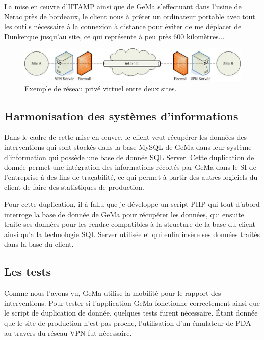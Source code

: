 La mise en \oe{}uvre d'IITAMP ainsi que de GeMa s'effectuant dans
l'usine de Nerac près de bordeaux, le client nous à prêter un ordinateur
portable avec tout les outils nécessaire à la connexion à distance pour
éviter de me déplacer de Dunkerque jusqu'au site, ce qui représente à
peu près 600 kilomètres...

\begin{figure}
  \begin{center}
    \includegraphics[scale=0.5]{images/vpn.png}
    \caption{Exemple de réseau privé virtuel entre deux sites.}
    \label{vpn}
  \end{center}
\end{figure}

\subsection{Harmonisation des systèmes d'informations} %
\label{sub:Harmonisation des systèmes d'informations}

Dans le cadre de cette mise en \oe{}uvre, le client veut récupérer les
données des interventions qui sont stockés dans la base MySQL de GeMa
dans leur système d'information qui possède une base de donnée SQL
Server. Cette duplication de donnée permet une intégration des
informations récoltés par GeMa dans le SI de l'entreprise à des fins de
traçabilité, ce qui permet à partir des autres logiciels du client de
faire des statistiques de production.

Pour cette duplication, il à fallu que je développe un script PHP qui
tout d'abord interroge la base de donnée de GeMa pour récupérer les
données, qui ensuite traite ses données pour les rendre compatibles à la
structure de la base du client ainsi qu'a la technologie SQL Server
utilisée et qui enfin insère ses données traités dans la base du client.

\subsection{Les tests} %
\label{sub:Les tests}

Comme nous l'avons vu, GeMa utilise la mobilité pour le rapport des
interventions. Pour tester si l'application GeMa fonctionne correctement
ainsi que le script de duplication de donnée, quelques tests furent
nécessaire. Étant donnée que le site de production n'est pas proche,
l'utilisation d'un émulateur de PDA au travers du réseau VPN fut
nécessaire.

